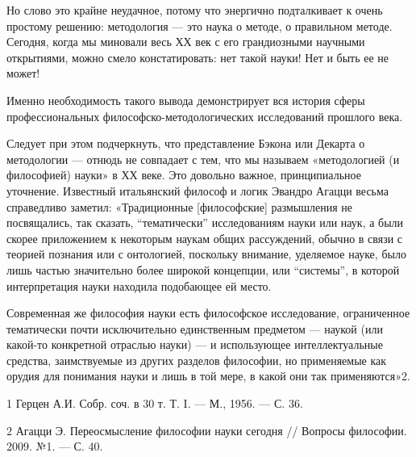 \documentclass[11pt,a4paper]{article}
\begin{document}
Но слово это крайне неудачное, потому что энергично подталкивает к очень
простому решению: методология — это наука о методе, о правильном
методе. Сегодня, когда мы миновали весь ХХ век с его грандиозными научными
открытиями, можно смело констатировать: нет такой науки! Нет и быть ее не
может!

Именно необходимость такого вывода демонстрирует вся история сферы
профессиональных философско-методологических исследований прошлого века.

Следует при этом подчеркнуть, что представление Бэкона или Декарта о
методологии — отнюдь не совпадает с тем, что мы называем «методологией (и
философией) науки» в ХХ веке.  Это довольно важное, принципиальное
уточнение. Известный итальянский философ и логик Эвандро Агацци весьма
справедливо заметил: «Традиционные [философские] размышления не посвящались,
так сказать, “тематически” исследованиям науки или наук, а были скорее
приложением к некоторым наукам общих рассуждений, обычно в связи с теорией
познания или с онтологией, поскольку внимание, уделяемое науке, было лишь
частью значительно более широкой концепции, или “системы”, в которой
интерпретация науки находила подобающее ей место.

Современная же философия науки есть философское исследование, ограниченное
тематически почти исключительно единственным предметом — наукой (или какой-то
конкретной отраслью науки) — и использующее интеллектуальные средства,
заимствуемые из других разделов философии, но применяемые как орудия для
понимания науки и лишь в той мере, в какой они так применяются»2.

1 Герцен А.И. Собр. соч. в 30 т. Т. I. — М., 1956. — С. 36.

2 Агацци Э. Переосмысление философии науки сегодня // Вопросы
философии. 2009. №1. — С. 40.
\end{document}
